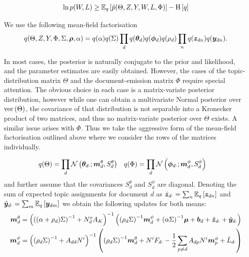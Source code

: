 \begin{align}
\ln p(W, L) \geq \ex{\hat{p}(\Theta, Z, Y, W, L, \Phi)}{q} - \ent{q}
\end{align}

We use the following mean-field factorisation
\begin{align}
q(\Theta, Z, Y, \Phi, \Sigma, \vv{\rho}, \alpha) = q(\alpha)q(\Sigma)\prod_d q(\thd)q(\vv{\phi}_d)q(\rho_d)\prod_n q(\vv{z}_{dn})q(\vv{y}_{dn}).
\end{align}

In most cases, the posterior is naturally conjugate to the prior and likelihood, and the parameter estimates are easily obtained. However, the cases of the topic-distribution matrix $\Theta$ and the document-emission matrix $\Phi$ require special attention. The obvious choice in each case is a matrix-variate posterior distribution, however while one can obtain a multivariate Normal posterior over $\vecf{\Theta}$, the covariance of that distribution is not separable into a Kronecker product of two matrices, and thus no matrix-variate posterior over $\Theta$ exists. A similar issue arises with $\Phi$. Thus we take the aggressive form of the mean-field factorisation outlined above where we consider the rows of the matrices individually.

\newcommand \mtd { { \vv{m}^{\theta}_d } }
\newcommand \std { { S^\theta_d } }
\newcommand \mpd { { \vv{m}^{\phi}_d } }
\newcommand \spd { { S^\phi_d } }

\begin{align}
q(\Theta) &= \prod_d \mathcal{N}\left(\thdo; \mtd, \std \right) &
q(\Phi) &= \prod_d \mathcal{N}\left(\phdo; \mpd, \spd\right) 
\end{align}
and further assume that the covariances $\std$ and $\spd$ are diagonal. Denoting the sum of expected topic assignments for document $d$ as $\hat{\vv{z}}_{d\cdot} = \sum_n \ex{\vv{z}_{dn}}{q}$ and $\hat{\vv{y}}_{d\cdot} = \sum_m \ex{\vv{y}_{dm}}{q}$ we obtain the following updates for both means:
\begin{align}
\mtd &= \invb{ \invb{(\alpha + \rho_d)\Sigma} + N^o_d A_K }
            \left(
                \invb{\rho_d \Sigma} \mpd
                + \invb{\alpha \Sigma}\vv{\mu}
                + \vv{b}_d 
                + \hat{\vv{z}}_{d\cdot}
                + \hat{\vv{y}}_{d\cdot}
            \right) \\
 \mpd & = \invb{\invb{\rho_d \Sigma} + A_{dd}N^i}
             \left(
                 \invb{\rho_d \Sigma}\mtd + N^i F_{d\cdot} -\half \sum_{p \neq d} A_{dp} N^i \vv{m}^\phi_p + \hat{L}_{d\cdot}
             \right)
 \end{align}
 
